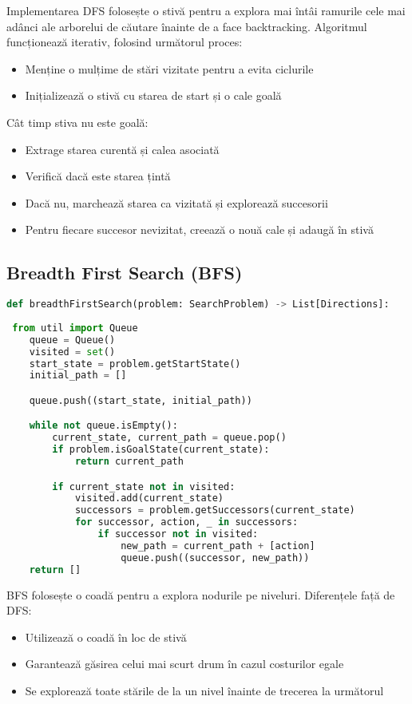 \documentclass[12pt,a4paper]{article}
\begin{document}
Implementarea DFS folosește o stivă pentru a explora mai întâi ramurile cele mai adânci ale arborelui de căutare înainte de a face backtracking. 
Algoritmul funcționează iterativ, folosind următorul proces:
\begin{itemize}
    \item Menține o mulțime de stări vizitate pentru a evita ciclurile
    \item  Inițializează o stivă cu starea de start și o cale goală \newline
\end{itemize}
	
Cât timp stiva nu este goală:
\begin{itemize}
  	\item  Extrage starea curentă și calea asociată
  	\item  Verifică dacă este starea țintă
  	\item  Dacă nu, marchează starea ca vizitată și explorează succesorii
  	\item  Pentru fiecare succesor nevizitat, creează o nouă cale și adaugă în stivă
\end{itemize}
	

\subsection{Breadth First Search (BFS)}
\begin{lstlisting}[language=Python]
def breadthFirstSearch(problem: SearchProblem) -> List[Directions]:
   
 from util import Queue
    queue = Queue()
    visited = set()
    start_state = problem.getStartState()
    initial_path = []

    queue.push((start_state, initial_path))

    while not queue.isEmpty():
        current_state, current_path = queue.pop()
        if problem.isGoalState(current_state):
            return current_path

        if current_state not in visited:
            visited.add(current_state)
            successors = problem.getSuccessors(current_state)
            for successor, action, _ in successors:
                if successor not in visited:
                    new_path = current_path + [action]
                    queue.push((successor, new_path))
    return []
\end{lstlisting}

BFS folosește o coadă pentru a explora nodurile pe niveluri. Diferențele față de DFS:
\begin{itemize}
    \item Utilizează o coadă în loc de stivă
    \item Garantează găsirea celui mai scurt drum în cazul costurilor egale
    \item Se explorează toate stările de la un nivel înainte de trecerea la următorul
\end{itemize}
\end{document}
